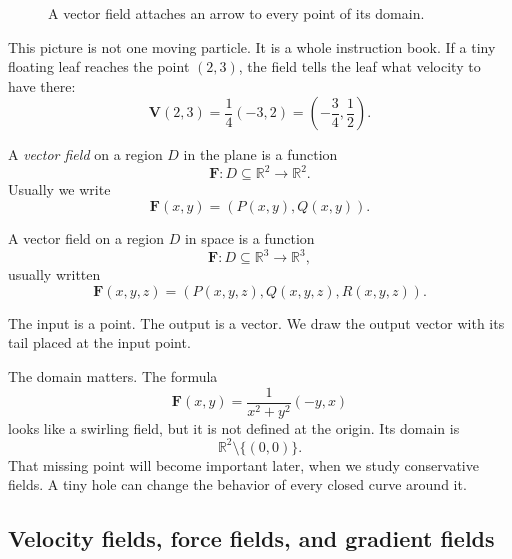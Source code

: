 \begin{figure}[h]
\centering
{}
\caption{A vector field attaches an arrow to every point of its domain.}
\end{figure}

This picture is not one moving particle.  It is a whole instruction book.  If a tiny
floating leaf reaches the point \((2,3)\), the field tells the leaf what velocity to have
there:
\[
    \mathbf V(2,3)=\frac14(-3,2)=\left(-\frac34,\frac12\right).
\]

\begin{definition}
A \emph{vector field} on a region \(D\) in the plane is a function
\[
    \mathbf F:D\subseteq\mathbb R^2\to\mathbb R^2.
\]
Usually we write
\[
    \mathbf F(x,y)=(P(x,y),Q(x,y)).
\]

A vector field on a region \(D\) in space is a function
\[
    \mathbf F:D\subseteq\mathbb R^3\to\mathbb R^3,
\]
usually written
\[
    \mathbf F(x,y,z)=(P(x,y,z),Q(x,y,z),R(x,y,z)).
\]
\end{definition}

The input is a point.  The output is a vector.  We draw the output vector with its tail
placed at the input point.

The domain matters.  The formula
\[
    \mathbf F(x,y)=\frac{1}{x^2+y^2}(-y,x)
\]
looks like a swirling field, but it is not defined at the origin.  Its domain is
\[
    \mathbb R^2\setminus\{(0,0)\}.
\]
That missing point will become important later, when we study conservative fields.
A tiny hole can change the behavior of every closed curve around it.

\subsection{Velocity fields, force fields, and gradient fields}

